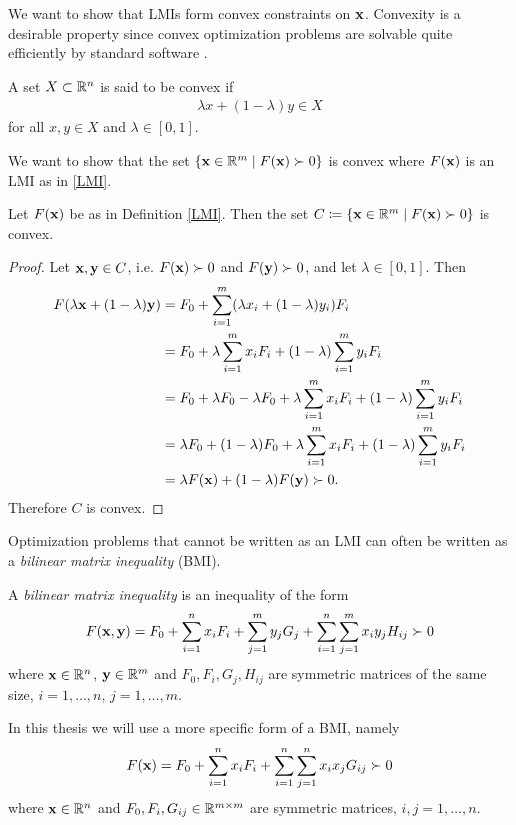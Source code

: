 \documentclass[a4paper,12pt,twoside,BCOR=10mm]{scrbook}
\begin{document}
We want to show that LMIs form convex constraints on $\mathbf{x}$. Convexity is a desirable property since convex optimization problems are solvable quite efficiently by standard software \citep{vABr2000lmibmi}.
\begin{definition}
A set $X \subset \mathbb{R}^{n}$ is said to be convex if
    \begin{align*}
        \lambda x + (1 - \lambda)y \in X
    \end{align*}
for all $x,y\in X$ and $\lambda \in [0,1]$.
\end{definition}
We want to show that the set $\{\mathbf{x}\in\mathbb{R}^{m} \mid F(\mathbf{x}) \succ 0\}$ is convex where $F(\mathbf{x})$ is an LMI as in \eqref{LMI}.
\begin{theorem}
Let $F(\mathbf{x})$ be as in Definition \ref{LMI}. Then the set $C \coloneqq \{\mathbf{x}\in\mathbb{R}^{m} \mid F(\mathbf{x}) \succ 0\}$ is convex.
\end{theorem}
\begin{proof}
Let $\mathbf{x}, \mathbf{y} \in C$, i.e. $F(\mathbf{x}) \succ 0$ and $F(\mathbf{y}) \succ 0$, and let $\lambda \in [0,1]$. Then
\begin{align*}
    F(\lambda\mathbf{x} + (1 - \lambda)\mathbf{y}) &= F_0 + \sum\limits_{i = 1}^m (\lambda x_i + (1 - \lambda)y_i)F_i\\
    &= F_0 + \lambda \sum\limits_{i = 1}^m x_i F_i + (1 - \lambda)\sum\limits_{i = 1}^m y_i F_i\\
    &= F_0 + \lambda F_0 - \lambda F_0 + \lambda \sum\limits_{i = 1}^m x_i F_i + (1 - \lambda)\sum\limits_{i = 1}^m y_i F_i\\
    &= \lambda F_0 + (1 - \lambda) F_0 + \lambda \sum\limits_{i = 1}^m x_i F_i + (1 - \lambda)\sum\limits_{i = 1}^m y_i F_i\\
    &= \lambda F(\mathbf{x}) + (1 - \lambda)F(\mathbf{y}) \succ 0.
\end{align*}
Therefore $C$ is convex.
\end{proof}

Optimization problems that cannot be written as an LMI can often be written as a \textit{bilinear matrix inequality} (BMI).

\begin{definition}\label{BMIDefinitionGeneral}
A \textit{bilinear matrix inequality} is an inequality of the form
    \begin{align*}
        F(\mathbf{x}, \mathbf{y}) = F_0 + \sum_{i = 1}^nx_iF_i + \sum_{j = 1}^m y_jG_j + \sum_{i = 1}^n \sum_{j = 1}^m x_iy_j H_{ij} \succ 0
    \end{align*}
where $\mathbf{x}\in \mathbb{R}^{n}$, $\mathbf{y}\in \mathbb{R}^{m}$ and $F_0, F_i, G_j, H_{ij}$ are symmetric matrices of the same size, $i = 1, \ldots, n$, $j = 1, \ldots, m$.
\end{definition}
In this thesis we will use a more specific form of a BMI, namely
\begin{align*}
    F(\mathbf{x}) = F_0 + \sum_{i = 1}^n x_i F_i + \sum_{i = 1}^n \sum_{j = 1}^n x_ix_j G_{ij} \succ 0
\end{align*}
where $\mathbf{x} \in \mathbb{R}^{n}$ and $F_0, F_i, G_{ij} \in \mathbb{R}^{m \times m}$ are symmetric matrices, $i,j = 1, \ldots, n$.
\end{document}

